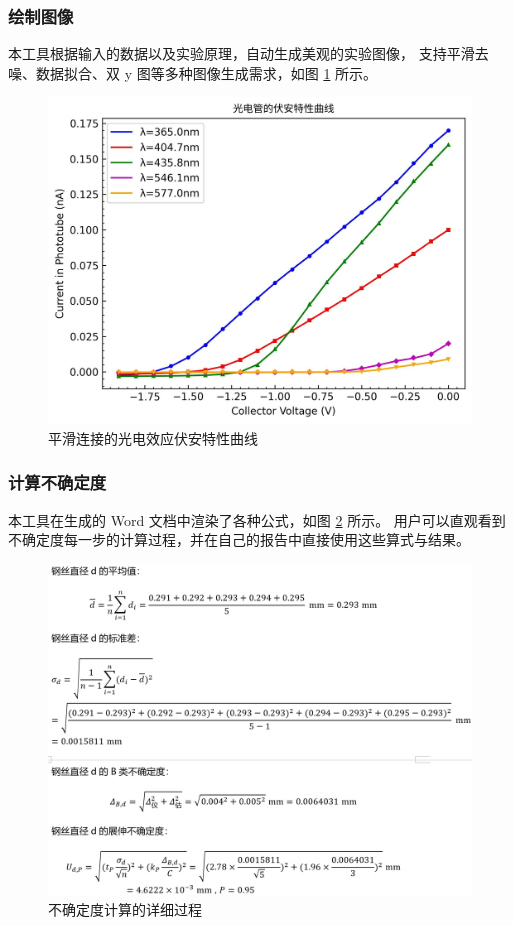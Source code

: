 \subsubsection*{绘制图像}

本工具根据输入的数据以及实验原理，自动生成美观的实验图像，
支持平滑去噪、数据拟合、双 y 图等多种图像生成需求，如图 \ref{fig:draw} 所示。

\begin{figure}[htbp]
  \centering
  \includegraphics[width=\columnwidth]{figure/draw.jpg}
  \caption{平滑连接的光电效应伏安特性曲线}
  \label{fig:draw}
\end{figure}

\subsubsection*{计算不确定度}

本工具在生成的 Word 文档中渲染了各种公式，如图 \ref{fig:calc} 所示。
用户可以直观看到不确定度每一步的计算过程，并在自己的报告中直接使用这些算式与结果。

\begin{figure}[htbp]
  \centering
  \includegraphics[width=\columnwidth]{figure/calc.png}
  \caption{不确定度计算的详细过程}
  \label{fig:calc}
\end{figure}

